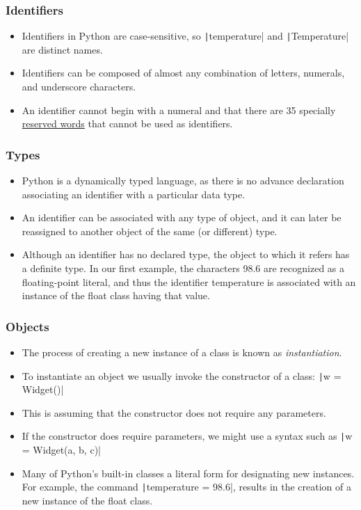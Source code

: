 \begin{frame}[fragile]
    \frametitle{Identifiers}

    \begin{itemize}
        \item Identifiers in Python are case-sensitive, so \texttt|temperature| and \texttt|Temperature| are distinct names.
        \item Identifiers can be composed of almost any combination of letters, numerals, and underscore characters.
        \item An identifier cannot begin with a numeral and that there are 35 specially \href{https://docs.python.org/3/reference/lexical_analysis.html#keywords}{reserved words} that cannot be used as identifiers.
    \end{itemize}

\end{frame}


\begin{frame}
    \frametitle{Types}

    \begin{itemize}
        \item Python is a dynamically typed language, as there is no advance declaration associating an identifier with a particular data type.
        \item An identifier can be associated with any type of object, and it can later be reassigned to another object of the same (or different) type.
        \item Although an identifier has no declared type, the object to which it refers has a definite type. In our first example, the characters 98.6 are recognized as a floating-point literal, and thus the identifier temperature is associated with an instance of the float class having that value.

    \end{itemize}

\end{frame}

\begin{frame}
    \frametitle{Objects}

    \begin{itemize}
        \item The process of creating a new instance of a class is known as \emph{instantiation}.
        \item To instantiate an object we usually invoke the constructor of a class: \texttt|w = Widget()|
        \item This is assuming that the constructor does not require any parameters.
        \item If the constructor does require parameters, we might use a syntax such as \texttt|w = Widget(a, b, c)|
        \item Many of Python's built-in classes a literal form for designating new instances. For example, the command \texttt|temperature = 98.6|, results in the creation of a new instance of the float class.

    \end{itemize}

\end{frame}

